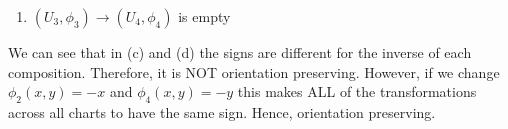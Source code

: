 \documentclass[12pt,a4paper]{report}
\begin{document}
\begin{enumerate}[label=21.\arabic*]
{\begin{enumerate}
\begin{align*}
		\phi_4\circ\phi_2^{-1}(x) &= \phi_4(\phi_2^{-1}(x)) = \phi_4(x, -\sqrt{1-x^2}) = -\sqrt{1-x^2}
	\end{align*}
	\item $(U_3, \phi_3) \to (U_4,\phi_4)$ is empty
\end{enumerate}We can see that in (c) and (d) the signs are different for the inverse of each composition.  Therefore, it is NOT orientation preserving.  However, if we change $\phi_2(x,y)=-x$ and $\phi_4(x,y) = -y$ this makes ALL of the transformations across all charts to have the same sign.  Hence, orientation preserving.
}

\end{enumerate}
\end{document}
